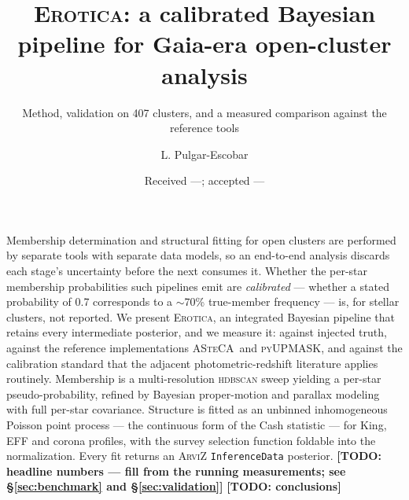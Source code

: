 \documentclass{aa}
\newcommand{\TODO}[1]{\textbf{[TODO: #1]}}
\newcommand{\erotica}{\textsc{Erotica}}
\newcommand{\asteca}{\textsc{ASteCA}}
\begin{document}
\title{\erotica: a calibrated Bayesian pipeline for Gaia-era open-cluster analysis}

\subtitle{Method, validation on 407 clusters, and a measured comparison against the reference tools}

\author{L. Pulgar-Escobar}


\date{Received ---; accepted ---}

\abstract
{Membership determination and structural fitting for open clusters are performed by separate
tools with separate data models, so an end-to-end analysis discards each stage's uncertainty
before the next consumes it. Whether the per-star membership probabilities such pipelines emit
are \emph{calibrated} --- whether a stated probability of 0.7 corresponds to a $\sim$70\%
true-member frequency --- is, for stellar clusters, not reported.}
{We present \erotica, an integrated Bayesian pipeline that retains every intermediate posterior,
and we measure it: against injected truth, against the reference implementations \asteca\ and
\textsc{pyUPMASK}, and against the calibration standard that the adjacent photometric-redshift
literature applies routinely.}
{Membership is a multi-resolution \textsc{hdbscan} sweep yielding a per-star pseudo-probability,
refined by Bayesian proper-motion and parallax modeling with full per-star covariance. Structure
is fitted as an unbinned inhomogeneous Poisson point process --- the continuous form of the Cash
statistic --- for King, EFF and corona profiles, with the survey selection function foldable into
the normalization. Every fit returns an \textsc{ArviZ} \texttt{InferenceData} posterior.}
{\TODO{headline numbers --- fill from the running measurements; see \S\ref{sec:benchmark} and
\S\ref{sec:validation}}}
{\TODO{conclusions}}


\maketitle

\end{document}
